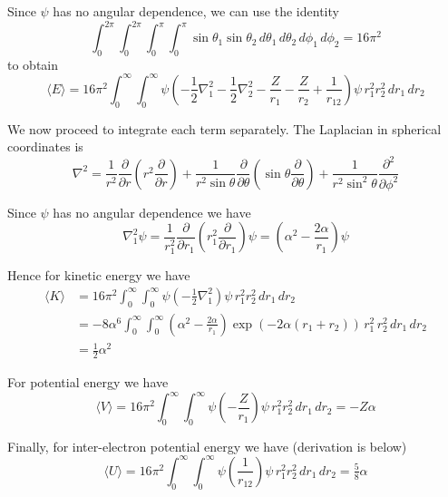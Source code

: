 \documentclass[12pt]{article}
\begin{document}
\noindent
Since $\psi$ has no angular dependence, we can use the identity
\begin{equation*}
\int_0^{2\pi}\int_0^{2\pi}\int_0^\pi\int_0^\pi\sin\theta_1\sin\theta_2
\,d\theta_1\,d\theta_2\,d\phi_1\,d\phi_2=16\pi^2
\tag{1}
\end{equation*}
to obtain
\begin{equation*}
\langle E\rangle=16\pi^2\int_0^\infty\int_0^\infty
\psi\left(
-\frac{1}{2}\nabla^2_1
-\frac{1}{2}\nabla^2_2
-\frac{Z}{r_1}
-\frac{Z}{r_2}
+\frac{1}{r_{12}}
\right)\psi
\,r_1^2 r_2^2
\,dr_1\,dr_2
\end{equation*}

\noindent
We now proceed to integrate each term separately.
The Laplacian in spherical coordinates is
\begin{equation*}
\nabla^2=\frac{1}{r^2}\frac{\partial}{\partial r}
\left(r^2\frac{\partial}{\partial r}\right)
+
\frac{1}{r^2\sin\theta}\frac{\partial}{\partial\theta}
\left(\sin\theta\frac{\partial}{\partial\theta}\right)
+
\frac{1}{r^2\sin^2\theta}\frac{\partial^2}{\partial\phi^2}
\end{equation*}

\noindent
Since $\psi$ has no angular dependence we have
\begin{equation*}
\nabla^2_1\psi=\frac{1}{r_1^2}\frac{\partial}{\partial r_1}
\left(r_1^2\frac{\partial}{\partial r_1}\right)\psi
=\left(\alpha^2-\frac{2\alpha}{r_1}\right)\psi
\end{equation*}

\noindent
Hence for kinetic energy we have
\begin{align*}
\langle K\rangle
&=
16\pi^2\int_0^\infty\int_0^\infty\psi\left(-\frac{1}{2}\nabla_1^2\right)\psi
\,r_1^2r_2^2
\,dr_1\,dr_2
\\
&=-8\alpha^6\int_0^\infty\int_0^\infty
\left(\alpha^2-\frac{2\alpha}{r_1}\right)\exp\left(-2\alpha(r_1+r_2)\right)
\,r_1^2\,r_2^2
\,dr_1\,dr_2
\\
&=\tfrac{1}{2}\alpha^2\tag{2}
\end{align*}

\noindent
For potential energy we have
\begin{equation*}
\langle V\rangle
=
16\pi^2\int_0^\infty\int_0^\infty\psi\left(-\frac{Z}{r_1}\right)\psi
\,r_1^2r_2^2
\,dr_1\,dr_2
=-Z\alpha\tag{3}
\end{equation*}

\noindent
Finally, for inter-electron potential energy we have (derivation is below)
\begin{equation*}
\langle U\rangle
=
16\pi^2\int_0^\infty\int_0^\infty\psi\left(\frac{1}{r_{12}}\right)\psi
\,r_1^2r_2^2
\,dr_1\,dr_2
=\tfrac{5}{8}\alpha
\tag{4}
\end{equation*}
\end{document}
